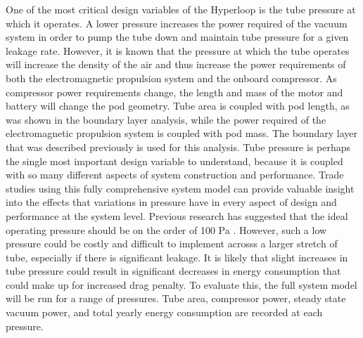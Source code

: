 One of the most critical design variables of the Hyperloop is the tube pressure
at which it operates. A lower pressure increases the power required of the
vacuum system in order to pump the tube down and maintain tube pressure for a
given leakage rate. However, it is known that the pressure at which the tube
operates will increase the density of the air and thus increase the power
requirements of both the electromagnetic propulsion system and the onboard compressor.
As compressor power requirements change, the length and mass of the motor and
battery will change the pod geometry. Tube area is coupled with pod length,
as was shown in the boundary layer analysis, while the power required of the
electromagnetic propulsion system is coupled with pod mass. The boundary layer
that was described previously is used for this analysis. Tube pressure is
perhaps the single most important design variable to understand, because it is
coupled with so many different aspects of system construction and performance.
Trade studies using this fully comprehensive system model can provide valuable
insight into the effects that variations in pressure have in every aspect of
design and performance at the system level.
Previous research has suggested that the ideal operating pressure should be on
the order of 100 Pa \cite{Musk, Chin}. However, such a low pressure could be
costly and difficult to implement acrosss a larger stretch of tube,
especially if there is significant leakage. It is likely that slight increases
in tube pressure could result in significant decreases in energy consumption
that could make up for increased drag penalty. To evaluate this, the full
system model will be run for a range of pressures. Tube area, compressor power,
steady state vacuum power, and total yearly energy consumption are recorded at each pressure.


